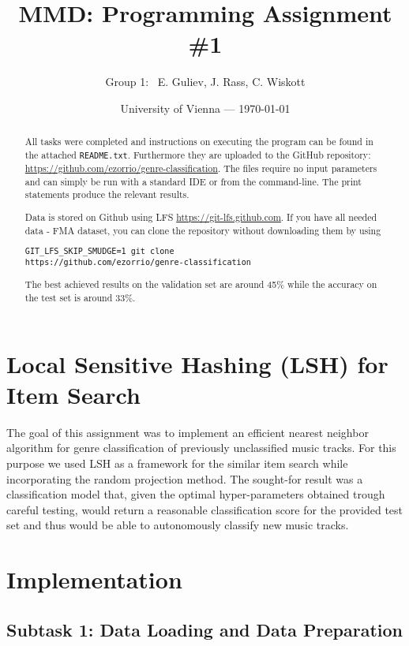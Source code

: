 \documentclass[11pt]{article}
\title{MMD: Programming Assignment \#1}
\author{Group 1:~ E. Guliev, J. Rass, C. Wiskott}
\date{University of Vienna --- \today} %
\begin{document}
\maketitle 

\begin{abstract}
All tasks were completed and instructions on executing the program can be found in the attached \texttt{README.txt}. Furthermore they are uploaded to the GitHub repository: \url{https://github.com/ezorrio/genre-classification}. The files require no input parameters and can simply be run with a standard IDE or from the command-line. The print statements produce the relevant results.

Data is stored on Github using LFS \url{https://git-lfs.github.com}. If you have all needed data - FMA dataset, you can clone the repository without downloading them by using 
\begin{lstlisting}
GIT_LFS_SKIP_SMUDGE=1 git clone
https://github.com/ezorrio/genre-classification
\end{lstlisting}


The best achieved results on the validation set are around 45\% while the accuracy on the test set is around 33\%.



\end{abstract}

\section*{Local Sensitive Hashing (LSH) for Item Search}

The goal of this assignment was to implement an efficient nearest neighbor algorithm for genre classification of previously unclassified music tracks. For this purpose we used LSH as a framework for the similar item search while incorporating the random projection method. The sought-for result was a classification model that, given the optimal hyper-parameters obtained trough careful testing, would return a reasonable classification score for the provided test set and thus would be able to autonomously classify new music tracks. 

\section*{Implementation}

\subsection*{Subtask 1: Data Loading and Data Preparation}
\end{document}
